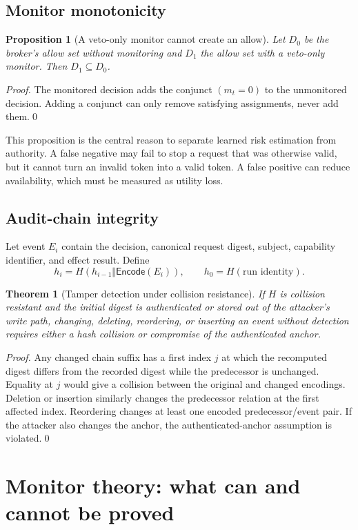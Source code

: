 \documentclass[11pt]{article}
\newtheorem{theorem}[definition]{Theorem}
\newtheorem{proposition}[definition]{Proposition}
\newcommand{\1}{\mathbf{1}}
\begin{document}
\subsection{Monitor monotonicity}
\begin{proposition}[A veto-only monitor cannot create an allow]
Let $D_0$ be the broker's allow set without monitoring and $D_1$ the allow set with a veto-only monitor. Then $D_1\subseteq D_0$.
\end{proposition}
\begin{proof}
The monitored decision adds the conjunct $(m_t=0)$ to the unmonitored decision. Adding a conjunct can only remove satisfying assignments, never add them.\qed\end{proof}

This proposition is the central reason to separate learned risk estimation from authority. A false negative may fail to stop a request that was otherwise valid, but it cannot turn an invalid token into a valid token. A false positive can reduce availability, which must be measured as utility loss.

\subsection{Audit-chain integrity}
Let event $E_i$ contain the decision, canonical request digest, subject, capability identifier, and effect result. Define
\[
 h_i=H(h_{i-1}\Vert\mathsf{Encode}(E_i)),\qquad h_0=H(\text{run identity}).
\]
\begin{theorem}[Tamper detection under collision resistance]
If $H$ is collision resistant and the initial digest is authenticated or stored out of the attacker's write path, changing, deleting, reordering, or inserting an event without detection requires either a hash collision or compromise of the authenticated anchor.
\end{theorem}
\begin{proof}
Any changed chain suffix has a first index $j$ at which the recomputed digest differs from the recorded digest while the predecessor is unchanged. Equality at $j$ would give a collision between the original and changed encodings. Deletion or insertion similarly changes the predecessor relation at the first affected index. Reordering changes at least one encoded predecessor/event pair. If the attacker also changes the anchor, the authenticated-anchor assumption is violated.\qed\end{proof}

\section{Monitor theory: what can and cannot be proved}
\end{document}
